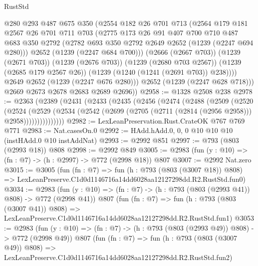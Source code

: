 \begin{lexlean}{RustStd}
\begin{coremodule}
            @280
            @293
            @487
            @675
            @350
            (@2554
              @182
              @26
              @701
              @713
              (@2564
                @179
                @181
                @2567
                @26
                @701
                @711
                @703
                (@2775
                  @173
                  @26
                  @91
                  @407
                  @700
                  @710
                  @487
                  @683
                  @350
                  @2792
                  (@2782 @693 @350 @2792 @2649 @2652 (@1239 (@2247 @694 @280)))
                  @2652
                  (@1239 (@2247 @684 @700)))
                (@2666 (@2667 @703))
                (@1239 (@2671 @703))
                (@1239 (@2676 @703))
                (@1239 (@2680 @703 @2567))
                (@1239 (@2685 @179 @2567 @26))
                (@1239 (@1240 (@1241 (@2691 @703)) @238))))
            @2649
            @2652
            (@1239 (@2247 @676 @280)))
          @2652
          (@1239 (@2247 @628 @718)))
        @2669
        @2673
        @2678
        @2683
        @2689
        @2696))
@2958 := @1328 @2508 @238
@2978 := @2363
    (@2389
      (@2431
        (@2433
          (@2435
            (@2456
              (@2474
                (@2488
                  (@2509
                    (@2520
                      (@2524
                        (@2529
                          (@2534
                            (@2542 (@2699 (@2705 (@2711 (@2814 (@2956 @2958))) @2958)))))))))))))))
@2982 := LexLeanPreservation.Rust.CrateOK @767 @769 @771
@2983 := Nat.casesOn.{0}
@2992 := HAdd.hAdd.{0, 0, 0} @10 @10 @10 (instHAdd.{0} @10 instAddNat)
@2993 := @2992 @851
@2997 := @793 (@803 (@2993 @18)) @808
@2998 := @2992 @849
@3005 := @2983 (fun (y : @10) => (fn : @7) -> (h : @2997) -> @772 (@2998 @18)) @807
@3007 := @2992 Nat.zero
@3015 := @3005
    (fun (fn : @7) =>
    fun (h : @793 (@803 (@3007 @18)) @808) =>
    LexLeanPreserve.C1d0d1146716a14dd6028aa12127298dd.R2.RustStd.fun0)
@3034 := @2983
    (fun (y : @10) => (fn : @7) -> (h : @793 (@803 (@2993 @41)) @808) -> @772 (@2998 @41))
    @807
    (fun (fn : @7) =>
    fun (h : @793 (@803 (@3007 @41)) @808) =>
    LexLeanPreserve.C1d0d1146716a14dd6028aa12127298dd.R2.RustStd.fun1)
@3053 := @2983
    (fun (y : @10) => (fn : @7) -> (h : @793 (@803 (@2993 @49)) @808) -> @772 (@2998 @49))
    @807
    (fun (fn : @7) =>
    fun (h : @793 (@803 (@3007 @49)) @808) =>
    LexLeanPreserve.C1d0d1146716a14dd6028aa12127298dd.R2.RustStd.fun2)

\end{coremodule}
\end{lexlean}
